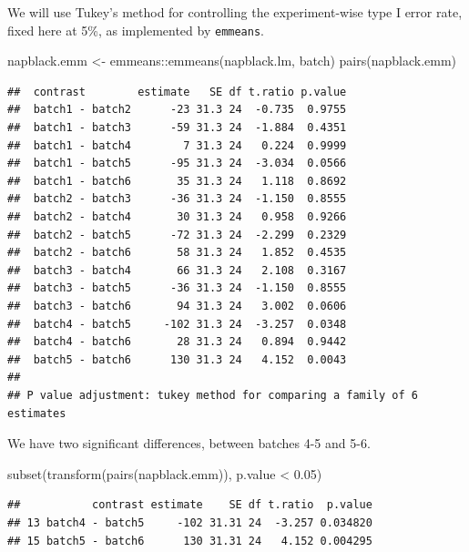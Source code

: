 \documentclass[
]{book}
\newenvironment{Shaded}{\begin{snugshade}}{\end{snugshade}}
\newcommand{\FloatTok}[1]{\textcolor[rgb]{0.00,0.00,0.81}{#1}}
\newcommand{\FunctionTok}[1]{\textcolor[rgb]{0.00,0.00,0.00}{#1}}
\newcommand{\NormalTok}[1]{#1}
\newcommand{\OtherTok}[1]{\textcolor[rgb]{0.56,0.35,0.01}{#1}}
\newcommand{\SpecialCharTok}[1]{\textcolor[rgb]{0.00,0.00,0.00}{#1}}
\newcommand{\StringTok}[1]{\textcolor[rgb]{0.31,0.60,0.02}{#1}}
\theoremstyle{definition}
\theoremstyle{definition}
\theoremstyle{definition}
\theoremstyle{definition}
\theoremstyle{remark}
\begin{document}
\begin{enumerate}
  We will use Tukey's method for controlling the experiment-wise type I error rate, fixed here at 5\%, as implemented by \texttt{emmeans}.

\begin{Shaded}
\begin{Highlighting}[]
\NormalTok{napblack.emm }\OtherTok{\textless{}{-}}\NormalTok{ emmeans}\SpecialCharTok{::}\FunctionTok{emmeans}\NormalTok{(napblack.lm, }\StringTok{\textquotesingle{}batch\textquotesingle{}}\NormalTok{)}
\FunctionTok{pairs}\NormalTok{(napblack.emm)}
\end{Highlighting}
\end{Shaded}

\begin{verbatim}
##  contrast        estimate   SE df t.ratio p.value
##  batch1 - batch2      -23 31.3 24  -0.735  0.9755
##  batch1 - batch3      -59 31.3 24  -1.884  0.4351
##  batch1 - batch4        7 31.3 24   0.224  0.9999
##  batch1 - batch5      -95 31.3 24  -3.034  0.0566
##  batch1 - batch6       35 31.3 24   1.118  0.8692
##  batch2 - batch3      -36 31.3 24  -1.150  0.8555
##  batch2 - batch4       30 31.3 24   0.958  0.9266
##  batch2 - batch5      -72 31.3 24  -2.299  0.2329
##  batch2 - batch6       58 31.3 24   1.852  0.4535
##  batch3 - batch4       66 31.3 24   2.108  0.3167
##  batch3 - batch5      -36 31.3 24  -1.150  0.8555
##  batch3 - batch6       94 31.3 24   3.002  0.0606
##  batch4 - batch5     -102 31.3 24  -3.257  0.0348
##  batch4 - batch6       28 31.3 24   0.894  0.9442
##  batch5 - batch6      130 31.3 24   4.152  0.0043
## 
## P value adjustment: tukey method for comparing a family of 6 estimates
\end{verbatim}

  We have two significant differences, between batches 4-5 and 5-6.

\begin{Shaded}
\begin{Highlighting}[]
\FunctionTok{subset}\NormalTok{(}\FunctionTok{transform}\NormalTok{(}\FunctionTok{pairs}\NormalTok{(napblack.emm)), p.value }\SpecialCharTok{\textless{}} \FloatTok{0.05}\NormalTok{)}
\end{Highlighting}
\end{Shaded}

\begin{verbatim}
##           contrast estimate    SE df t.ratio  p.value
## 13 batch4 - batch5     -102 31.31 24  -3.257 0.034820
## 15 batch5 - batch6      130 31.31 24   4.152 0.004295
\end{verbatim}
\end{enumerate}
\end{document}

